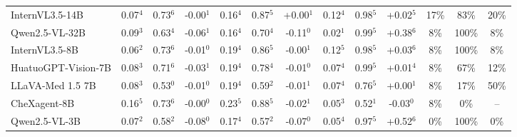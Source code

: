 \documentclass{article}
\begin{document}
\begin{table}[t]
\begin{tabular}{l@{\hspace{3pt}}ccc@{\hspace{4pt}}ccc@{\hspace{4pt}}ccc@{\hspace{4pt}}ccc}
InternVL3.5-14B & \cellcolor{cfSage2}0.07$^{4}$ & \cellcolor{cfSage2}0.73$^{6}$ & \cellcolor{cfSlate1}-0.00$^{1}$ & \cellcolor{cfSage3}0.16$^{4}$ & \cellcolor{cfSage3}0.87$^{5}$ & \cellcolor{cfTerra1}+0.00$^{1}$ & \cellcolor{cfSage3}0.12$^{4}$ & \cellcolor{cfSage4}0.98$^{5}$ & \cellcolor{cfTerra1}+0.02$^{5}$ & \cellcolor{cfTerra3}17\% & \cellcolor{cfTerra3}83\% & 20\% \\
Qwen2.5-VL-32B & \cellcolor{cfSage2}0.09$^{3}$ & \cellcolor{cfSage2}0.63$^{4}$ & \cellcolor{cfSlate2}-0.06$^{1}$ & \cellcolor{cfSage3}0.16$^{4}$ & \cellcolor{cfSage2}0.70$^{4}$ & \cellcolor{cfSlate3}-0.11$^{0}$ & \cellcolor{cfSage1}0.02$^{1}$ & \cellcolor{cfSage4}0.99$^{5}$ & \cellcolor{cfTerra4}+0.38$^{6}$ & \cellcolor{cfTerra2}8\% & \cellcolor{cfTerra4}100\% & 8\% \\
InternVL3.5-8B & \cellcolor{cfSage2}0.06$^{2}$ & \cellcolor{cfSage2}0.73$^{6}$ & \cellcolor{cfSlate1}-0.01$^{0}$ & \cellcolor{cfSage3}0.19$^{4}$ & \cellcolor{cfSage3}0.86$^{5}$ & \cellcolor{cfSlate1}-0.00$^{1}$ & \cellcolor{cfSage2}0.12$^{5}$ & \cellcolor{cfSage4}0.98$^{5}$ & \cellcolor{cfTerra2}+0.03$^{6}$ & \cellcolor{cfTerra2}8\% & \cellcolor{cfTerra4}100\% & 8\% \\
HuatuoGPT-Vision-7B & \cellcolor{cfSage2}0.08$^{3}$ & \cellcolor{cfSage2}0.71$^{6}$ & \cellcolor{cfSlate2}-0.03$^{1}$ & \cellcolor{cfSage3}0.19$^{4}$ & \cellcolor{cfSage3}0.78$^{4}$ & \cellcolor{cfSlate1}-0.01$^{0}$ & \cellcolor{cfSage2}0.07$^{4}$ & \cellcolor{cfSage4}0.99$^{5}$ & \cellcolor{cfTerra1}+0.01$^{4}$ & \cellcolor{cfTerra2}8\% & \cellcolor{cfTerra3}67\% & 12\% \\
LLaVA-Med 1.5 7B & \cellcolor{cfSage2}0.08$^{3}$ & \cellcolor{cfSage1}0.53$^{0}$ & \cellcolor{cfSlate1}-0.01$^{0}$ & \cellcolor{cfSage3}0.19$^{4}$ & \cellcolor{cfSage1}0.59$^{2}$ & \cellcolor{cfSlate1}-0.01$^{1}$ & \cellcolor{cfSage2}0.07$^{4}$ & \cellcolor{cfSage3}0.76$^{5}$ & \cellcolor{cfTerra1}+0.00$^{1}$ & \cellcolor{cfTerra2}8\% & \cellcolor{cfTerra2}17\% & 50\% \\
CheXagent-8B & \cellcolor{cfSage3}0.16$^{5}$ & \cellcolor{cfSage2}0.73$^{6}$ & \cellcolor{cfSlate1}-0.00$^{0}$ & \cellcolor{cfSage4}0.23$^{5}$ & \cellcolor{cfSage3}0.88$^{5}$ & \cellcolor{cfSlate1}-0.02$^{1}$ & \cellcolor{cfSage2}0.05$^{3}$ & \cellcolor{cfSage1}0.52$^{1}$ & \cellcolor{cfSlate2}-0.03$^{0}$ & \cellcolor{cfTerra2}8\% & \cellcolor{cfTerra1}0\% & -- \\
Qwen2.5-VL-3B & \cellcolor{cfSage2}0.07$^{2}$ & \cellcolor{cfSage1}0.58$^{2}$ & \cellcolor{cfSlate2}-0.08$^{0}$ & \cellcolor{cfSage3}0.17$^{4}$ & \cellcolor{cfSage1}0.57$^{2}$ & \cellcolor{cfSlate2}-0.07$^{0}$ & \cellcolor{cfSage1}0.05$^{4}$ & \cellcolor{cfSage4}0.97$^{5}$ & \cellcolor{cfTerra4}+0.52$^{6}$ & \cellcolor{cfTerra1}0\% & \cellcolor{cfTerra4}100\% & 0\% \\

\end{tabular}
\end{table}
\end{document}

